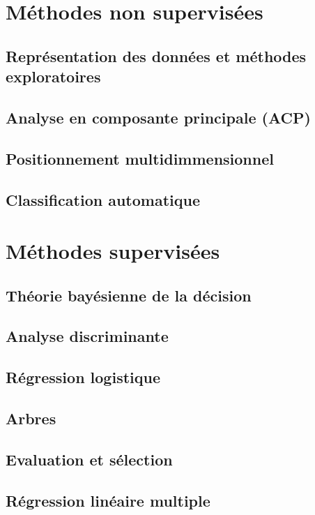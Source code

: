 \section{Méthodes non supervisées}
\subsection{Représentation des données et méthodes exploratoires}
\subsection{Analyse en composante principale (ACP)}
\subsection{Positionnement multidimmensionnel}
\subsection{Classification automatique}

\section{Méthodes supervisées}
\subsection{Théorie bayésienne de la décision}
\subsection{Analyse discriminante}
\subsection{Régression logistique}
\subsection{Arbres}
\subsection{Evaluation et sélection}
\subsection{Régression linéaire multiple}